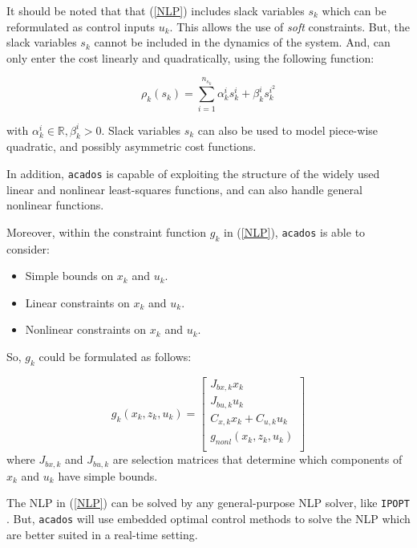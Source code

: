 \documentclass{thesisreport}
\begin{document}
    
    It should be noted that that (\ref{NLP}) includes slack variables $s_k$ which can be reformulated as control inputs $u_k$. This allows the use of \textit{soft} constraints. 
But, the slack variables $s_k$ cannot be included in the dynamics of the system. And, can only enter the cost linearly and quadratically, using the following function:

\begin{equation}
	\rho_k(s_k) = \sum_{i=1}^{n_{s_k}} \alpha_k^i s_k^i + \beta_k^i s_k^{i^2}
\end{equation}

with $\alpha_k^i \in \mathbb{R}, \beta_k^i > 0$. Slack variables $s_k$ can also be used to model piece-wise quadratic, and possibly asymmetric cost functions.
    
In addition, \texttt{acados} is capable of exploiting the structure of the widely used linear and nonlinear least-squares functions, and can also handle general nonlinear functions.
    
Moreover, within the constraint function $g_k$ in (\ref{NLP}), \texttt{acados} is able to consider: 

\begin{itemize}
	\item Simple bounds on $x_k$ and $u_k$.
	\item Linear constraints on $x_k$ and $u_k$.
	\item Nonlinear constraints on $x_k$ and $u_k$.
\end{itemize}
    
So, $g_k$ could be formulated as follows:

\begin{equation}
        g_k(x_k, z_k, u_k) = \begin{bmatrix}
            J_{bx,k}x_k \\
            J_{bu,k}u_k \\
            C_{x,k}x_k + C_{u,k}u_k \\
            g_{nonl}(x_k, z_k, u_k) \\
        \end{bmatrix}
    \end{equation}
    where $J_{bx,k}$ and $J_{bu,k}$ are selection matrices that determine which components of $x_k$ and $u_k$ have simple bounds.

The NLP in (\ref{NLP}) can be solved by any general-purpose NLP solver, like \texttt{IPOPT} \cite{IPOPT}. But, \texttt{acados} will use embedded optimal control methods to solve the NLP which are better suited in a real-time setting. 
\end{document}
